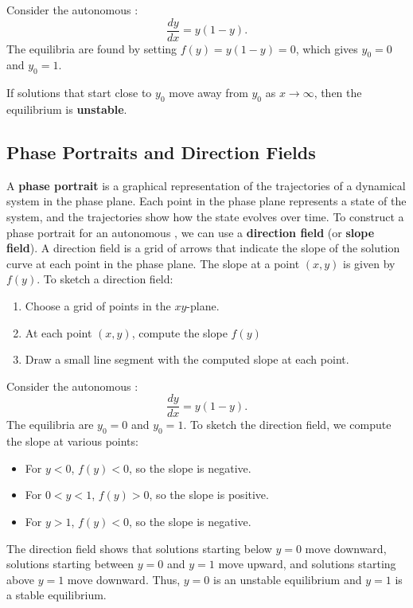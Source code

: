 \begin{example}
  Consider the autonomous \ode{}:
  \[
  \frac{dy}{dx} = y(1-y).
  \]
  The equilibria are found by setting \(f(y) = y(1-y) = 0\), which gives \(y_0 = 0\) and \(y_0 = 1\).
\end{example}
If solutions that start close to \(y_0\) move away from \(y_0\) as \(x \to \infty\), then the equilibrium is \textbf{unstable}.

\subsection{Phase Portraits and Direction Fields}
A \textbf{phase portrait} is a graphical representation of the trajectories of a dynamical
system in the phase plane.
Each point in the phase plane represents a state of the system, and the trajectories show how the state evolves over time.
To construct a phase portrait for an autonomous \ode{}, we can use a \textbf{direction field} (or \textbf{slope field}).
A direction field is a grid of arrows that indicate the slope of the solution curve at each point in the phase plane.
The slope at a point \((x,y)\) is given by \(f(y)\).
To sketch a direction field:
\begin{enumerate}
    \item Choose a grid of points in the \(xy\)-plane.
    \item At each point \((x,y)\), compute the slope \(f(y)\)
    \item Draw a small line segment with the computed slope at each point.
\end{enumerate}

\begin{example}
  Consider the autonomous \ode{}:
  \[
  \frac{dy}{dx} = y(1-y).
  \]
  The equilibria are \(y_0 = 0\) and \(y_0 = 1\).
  To sketch the direction field, we compute the slope at various points:
  \begin{itemize}
      \item For \(y < 0\), \(f(y) < 0\), so the slope is negative.
      \item For \(0 < y < 1\), \(f(y) > 0\), so the slope is positive.
      \item For \(y > 1\), \(f(y) < 0\), so the slope is negative.
  \end{itemize}
  The direction field shows that solutions starting below \(y=0\) move downward, solutions starting between \(y=0\) and \(y=1\) move upward, and solutions starting above \(y=1\) move downward.
  Thus, \(y=0\) is an unstable equilibrium and \(y=1\) is a stable equilibrium.
\end{example}


